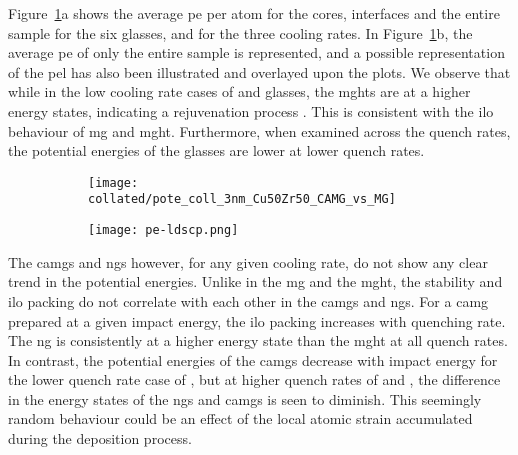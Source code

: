 \begin{changebar}
Figure~\ref{f:camg_pote}a shows the average \gls{pe} per atom for the cores, interfaces and the entire sample for the six glasses, and for the three cooling rates. In Figure~\ref{f:camg_pote}b, the average \gls{pe} of only the entire sample is represented, and a possible representation of the \gls{pel} has also been illustrated and overlayed upon the plots. We observe that while in the low cooling rate cases of  and  \cz glasses, the \gls{mght}s are at a higher energy states, indicating a rejuvenation process \cite{Wakeda2015,Saida2017}. This is consistent with the \gls{ilo} behaviour of \gls{mg} and \gls{mght}. Furthermore, when examined across the quench rates, the potential energies of the glasses are lower at lower quench rates. \par
\end{changebar}

\begin{figure}[!h] %
	\begin{subfigure}{\textwidth}
		\texttt{[image: collated/pote\_coll\_3nm\_Cu50Zr50\_CAMG\_vs\_MG]}
	\end{subfigure}%
	\vfill
	\begin{subfigure}{\textwidth}
		\texttt{[image: pe-ldscp.png]}
	\end{subfigure}%
	\label{f:camg_pote}
\end{figure}

The \gls{camg}s and \gls{ng}s however, for any given cooling rate, do not show any clear trend in the potential energies. Unlike in the \gls{mg} and the \gls{mght}, the stability and \gls{ilo} packing do not correlate with each other in the \gls{camg}s and \gls{ng}s. For a \gls{camg} prepared at a given impact energy, the \gls{ilo} packing increases with quenching rate. The \gls{ng} is consistently at a higher energy state than the \gls{mght} at all quench rates. In contrast, the potential energies of the \gls{camg}s decrease with impact energy for the lower quench rate case of , but at higher quench rates of  and , the difference in the energy states of the \gls{ng}s and \gls{camg}s is seen to diminish. This seemingly random behaviour could be an effect of the local atomic strain accumulated during the deposition process. \par

